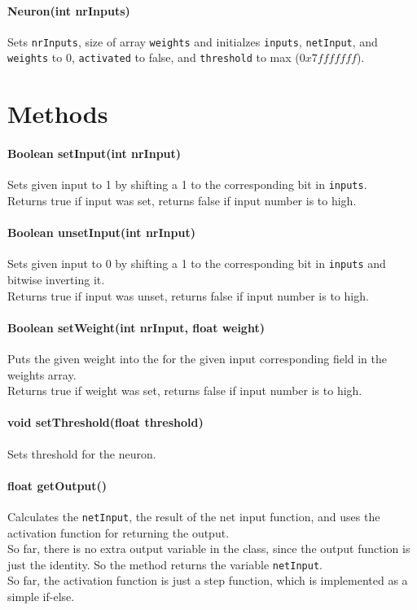 \paragraph{Neuron(int nrInputs)}
Sets \texttt{nrInputs}, size of array \texttt{weights} and initialzes \texttt{inputs}, \texttt{netInput}, and \texttt{weights} to 0, \texttt{activated} to false, and \texttt{threshold} to max ($0x7fffffff$).

\section{Methods}
\paragraph{Boolean setInput(int nrInput)}
Sets given input to 1 by shifting a 1 to the corresponding bit in \texttt{inputs}.\\
Returns true if input was set, returns false if input number is to high.

\paragraph{Boolean unsetInput(int nrInput)}
Sets given input to 0 by shifting a 1 to the corresponding bit in \texttt{inputs} and bitwise inverting it.\\
Returns true if input was unset, returns false if input number is to high.

\paragraph{Boolean setWeight(int nrInput, float weight)}
Puts the given weight into the for the given input corresponding field in the weights array.\\
Returns true if weight was set, returns false if input number is to high.

\paragraph{void setThreshold(float threshold)}
Sets threshold for the neuron.

\paragraph{float getOutput()}
Calculates the \texttt{netInput}, the result of the net input function, and uses the activation function for returning the output.\\
So far, there is no extra output variable in the class, since the output function is just the identity. So the method returns the variable \texttt{netInput}.\\
So far, the activation function is just a step function, which is implemented as a simple if-else.

